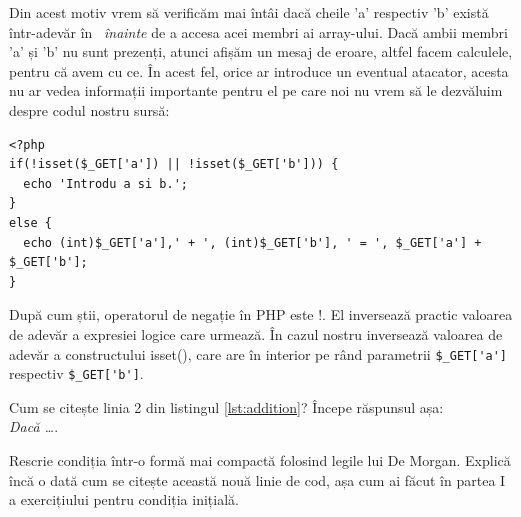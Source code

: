 Din acest motiv vrem să verificăm mai întâi
dacă cheile 'a' respectiv 'b' există într-adevăr în \get\ \textit{înainte}
de a accesa acei membri ai array-ului. Dacă ambii membri 'a'
și 'b' nu sunt prezenți, atunci afișăm un mesaj de eroare,
altfel facem calculele, pentru că avem cu ce. În acest fel,
orice ar introduce un eventual atacator, acesta nu ar
vedea informații importante pentru el pe care noi nu vrem
să le dezvăluim despre codul nostru sursă:
\begin{lstlisting}[label=lst:addition,caption={Un calculator simplu}]
<?php
if(!isset($_GET['a']) || !isset($_GET['b'])) {
  echo 'Introdu a si b.';
}
else {
  echo (int)$_GET['a'],' + ', (int)$_GET['b'], ' = ', $_GET['a'] + $_GET['b'];
}
\end{lstlisting}
După cum știi, operatorul de negație în PHP este !. El inversează practic valoarea
de adevăr a expresiei logice care urmează. În cazul nostru inversează
valoarea de adevăr a constructului isset(),
care are în interior pe rând parametrii \verb|$_GET['a']| respectiv  \verb|$_GET['b']|.
\begin{Exercise}[title={Înțelege expresia logică},difficulty=1]
\ExePart
Cum se citește linia 2 din listingul \ref{lst:addition}? Începe răspunsul așa:\\
\textit{Dacă \ldots}.

\ExePart

Rescrie condiția într-o formă {\glqq}mai compactă{\grqq} folosind legile lui De Morgan.
Explică încă o dată cum se citește această nouă linie de cod, așa cum
ai făcut în partea I a exercițiului pentru condiția inițială.
\end{Exercise}


